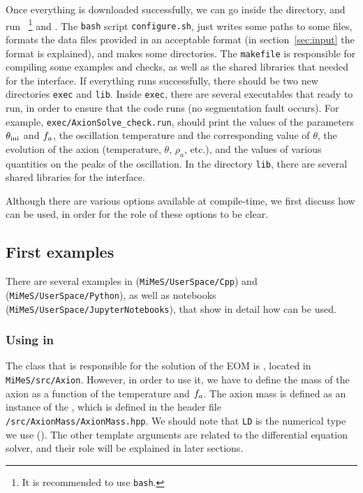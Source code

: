 \documentclass[11pt,a4paper]{article}
\begin{document}
Once everything is downloaded successfully, we can go inside the \mimes directory, and run ~\footnote{It is recommended to use {\tt bash}.} and .  The {\tt bash} script {\tt configure.sh}, just writes some paths to some files, formats the data files provided in an acceptable format (in section~\ref{sec:input} the format is explained), and makes some directories.
%
The {\tt makefile} is responsible for compiling some examples and checks, as well as the shared libraries that needed for the \PY interface.  If everything runs successfully, there should be two new directories {\tt exec} and {\tt lib}. Inside {\tt exec}, there are several executables that ready to run, in order to ensure that the code runs (\eg no segmentation fault occurs). For example, {\tt exec/AxionSolve\_check.run}, should print the values of the parameters $\theta_{\rm ini}{}$ and $f_{a}{}$, the oscillation temperature and the corresponding value of $\theta$, the evolution of the axion (\eg temperature, $\theta$, $\rho_{a}$, etc.), and the values of various quantities on the peaks of the oscillation.  In the directory {\tt lib}, there are several shared libraries for the \PY interface.

Although there are various options available at compile-time, we first discuss how \mimes can be used, in order for the role of these options to be clear. 


\subsection{First examples}\label{sec:First_examples} 
%
There are several examples in \CPP ({\tt MiMeS/UserSpace/Cpp}) and \PY ({\tt MiMeS/UserSpace/Python}), as well as \JUPY  notebooks ({\tt MiMeS/UserSpace/JupyterNotebooks}), that show in detail how \mimes can be used. 

\subsubsection{Using \mimes in \CPP}\label{sec:cpp_first_example}
%
The class that is responsible for the solution of the EOM is , located in {\tt MiMeS/src/Axion}. However, in order to use it, we have to define the mass of the axion as a function of the temperature and $f_{a}{}$. The axion mass is defined as an instance of the , which is defined in the header file {\tt \mimes/src/AxionMass/AxionMass.hpp}. We should note that {\tt LD} is the numerical type we use (). The other template arguments are related to the differential equation solver, and their role will be explained in later sections. 
\end{document}
